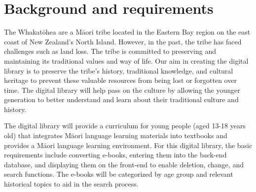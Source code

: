 \chapter{Background and requirements}

The Whakatōhea are a Māori tribe located in the Eastern Bay region on the east coast of New Zealand's North Island. However, in the past, the tribe has faced challenges such as land loss. The tribe is committed to preserving and maintaining its traditional values and way of life. Our aim in creating the digital library is to preserve the tribe's history, traditional knowledge, and cultural heritage to prevent these valuable resources from being lost or forgotten over time. The digital library will help pass on the culture by allowing the younger generation to better understand and learn about their traditional culture and history.

The digital library will provide a curriculum for young people (aged 13-18 years old) that integrates Māori language learning materials into textbooks and provides a Māori language learning environment. For this digital library, the basic requirements include converting e-books, entering them into the back-end database, and displaying them on the front-end to enable deletion, change, and search functions. The e-books will be categorized by age group and relevant historical topics to aid in the search process.
